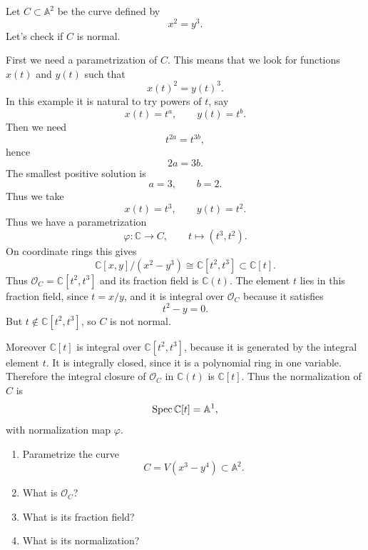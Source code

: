 \begin{example}
Let $C \subset \mathbb{A}^2$ be the curve
defined by
$$
x^2=y^3.
$$
Let's check if $C$ is normal.

First we need a parametrization of $C$.
This means that we look for functions
$x(t)$ and $y(t)$ such that
$$
x(t)^2=y(t)^3.
$$
In this example it is natural to try powers
of $t$, say
$$
x(t)=t^a,\qquad y(t)=t^b.
$$
Then we need
$$
t^{2a}=t^{3b},
$$
hence
$$
2a=3b.
$$
The smallest positive solution is
$$
a=3,\qquad b=2.
$$
Thus we take
$$
x(t)=t^3,\qquad y(t)=t^2.
$$
Thus we have a parametrization
$$
\varphi:\mathbb{C}\to C,\qquad
t\longmapsto (t^3,t^2).
$$
On coordinate rings this gives
$$
\mathbb{C}[x,y]/(x^2-y^3)
\cong \mathbb{C}[t^2,t^3]
\subset \mathbb{C}[t].
$$
Thus $\mathcal{O}_C=\mathbb{C}[t^2,t^3]$
and its fraction field is $\mathbb{C}(t)$.
The element $t$ lies in this fraction field,
since $t=x/y$, and it is integral over
$\mathcal{O}_C$ because it satisfies
$$
t^2-y=0.
$$
But $t\notin \mathbb{C}[t^2,t^3]$,
so $C$ is not normal.

Moreover $\mathbb{C}[t]$ is integral over
$\mathbb{C}[t^2,t^3]$, because it is
generated by the integral element $t$.
It is integrally closed, since it is a
polynomial ring in one variable.
Therefore the integral closure of
$\mathcal{O}_C$ in $\mathbb{C}(t)$
is $\mathbb{C}[t]$.
Thus the normalization of $C$ is
$$
\mathop{\mathrm{Spec}} \mathbb{C}[t]=\mathbb{A}^1,
$$
with normalization map $\varphi$.
\end{example}


\begin{exercise}
\label{exercise-normalization}
\begin{enumerate}
\item Parametrize the curve
$$
C = V(x^3-y^4) \subset \mathbb{A}^2.
$$
\item What is $\mathcal{O}_C$?
\label{item-2-exer-normalization}
\item What is its fraction field?
\item What is its normalization?
\end{enumerate}
\end{exercise}

